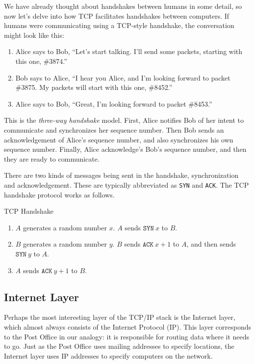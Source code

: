 We have already thought about handshakes between humans in some detail, so now let's delve into how TCP facilitates handshakes between computers. If humans were communicating using a TCP-style handshake, the conversation might look like this:
\begin{enumerate}
    \item Alice says to Bob, ``Let's start talking. I'll send some packets, starting with this one, \#3874.''
    \item Bob says to Alice, ``I hear you Alice, and I'm looking forward to packet \#3875. My packets will start with this one, \#8452.''
    \item Alice says to Bob, ``Great, I'm looking forward to packet \#8453.''
\end{enumerate}
This is the \emph{three-way handshake} model. First, Alice notifies Bob of her intent to communicate and synchronizes her sequence number. Then Bob sends an acknowledgement of Alice's sequence number, and also synchronizes his own sequence number. Finally, Alice acknowledge's Bob's sequence number, and then they are ready to communicate.

There are two kinds of messages being sent in the handshake, synchronization and acknowledgement. These are typically abbreviated as \texttt{SYN} and \texttt{ACK}. The TCP handshake protocol works as follows.
\begin{graybox}
{\Large TCP Handshake}
\begin{enumerate}
    \item $A$ generates a random number $x$. $A$ sends $\boxed{\texttt{SYN}\ x}$ to $B$.
    \item $B$ generates a random number $y$. $B$ sends $\boxed{\texttt{ACK}\ x+1}$ to $A$, and then sends $\boxed{\texttt{SYN}\ y}$ to $A$.
    \item $A$ sends $\boxed{\texttt{ACK}\ y+1}$ to $B$.
\end{enumerate}
\end{graybox}

\subsection{Internet Layer}

Perhaps the most interesting layer of the TCP/IP stack is the Internet layer, which almost always consists of the Internet Protocol (IP). This layer corresponds to the Post Office in our analogy: it is responsible for routing data where it needs to go. Just as the Post Office uses mailing addresses to specify locations, the Internet layer uses IP addresses to specify computers on the network.

